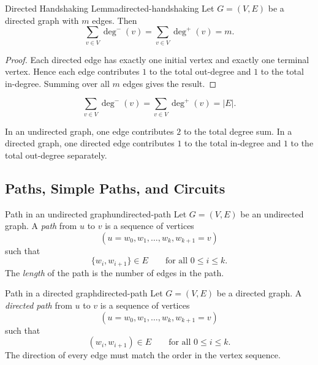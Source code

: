 \begin{theorem}{Directed Handshaking Lemma}{directed-handshaking}
Let \(G=(V,E)\) be a directed graph with \(m\) edges. Then
\[
\sum_{v\in V}\deg^{-}(v)
=
\sum_{v\in V}\deg^{+}(v)
=
m.
\]
\end{theorem}

\begin{proof}
Each directed edge has exactly one initial vertex and exactly one terminal vertex. Hence each edge contributes \(1\) to the total out-degree and \(1\) to the total in-degree. Summing over all \(m\) edges gives the result.
\end{proof}

\begin{keyformula}[title={Directed Handshaking Lemma}]
\[
\sum_{v\in V}\deg^{-}(v)=\sum_{v\in V}\deg^{+}(v)=|E|.
\]
\end{keyformula}

\begin{commonmistake}[title={Undirected degree versus directed degree}]
In an undirected graph, one edge contributes \(2\) to the total degree sum. In a directed graph, one directed edge contributes \(1\) to the total in-degree and \(1\) to the total out-degree separately.
\end{commonmistake}

\subsection{Paths, Simple Paths, and Circuits}

\begin{definition}{Path in an undirected graph}{undirected-path}
Let \(G=(V,E)\) be an undirected graph. A \emph{path} from \(u\) to \(v\) is a sequence of vertices
\[
(u=w_0,w_1,\dots,w_k,w_{k+1}=v)
\]
such that
\[
\{w_i,w_{i+1}\}\in E
\qquad
\text{for all }0\le i\le k.
\]
The \emph{length} of the path is the number of edges in the path.
\end{definition}

\begin{definition}{Path in a directed graph}{directed-path}
Let \(G=(V,E)\) be a directed graph. A \emph{directed path} from \(u\) to \(v\) is a sequence of vertices
\[
(u=w_0,w_1,\dots,w_k,w_{k+1}=v)
\]
such that
\[
(w_i,w_{i+1})\in E
\qquad
\text{for all }0\le i\le k.
\]
The direction of every edge must match the order in the vertex sequence.
\end{definition}

